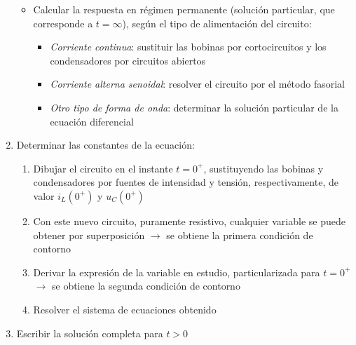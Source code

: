 \begin{enumerate}
\begin{itemize}
  \item Calcular la respuesta en régimen permanente (solución
    particular, que corresponde a $t=\infty$), según el tipo de
    alimentación del circuito:
    \begin{itemize}
    \item \textit{Corriente continua}: sustituir las bobinas por
      cortocircuitos y los condensadores por circuitos abiertos
    \item \textit{Corriente alterna senoidal}: resolver el circuito
      por el método fasorial
    \item \textit{Otro tipo de forma de onda}: determinar la solución
      particular de la ecuación diferencial
    \end{itemize}
  \end{itemize}
\item Determinar las constantes de la ecuación:
  \begin{enumerate}
  \item Dibujar el circuito en el instante $t=0^+$, sustituyendo las
    bobinas y condensadores por fuentes de intensidad y tensión,
    respectivamente, de valor $i_L(0^+)$ y $u_C(0^+)$
  \item Con este nuevo circuito, puramente resistivo, cualquier
    variable se puede obtener por superposición $\rightarrow$ se
    obtiene la primera condición de contorno
  \item Derivar la expresión de la variable en estudio,
    particularizada para $t=0^+$ $\rightarrow$ se obtiene la segunda
    condición de contorno
  \item Resolver el sistema de ecuaciones obtenido
  \end{enumerate}
\item Escribir la solución completa para $t>0$
\end{enumerate}
	
